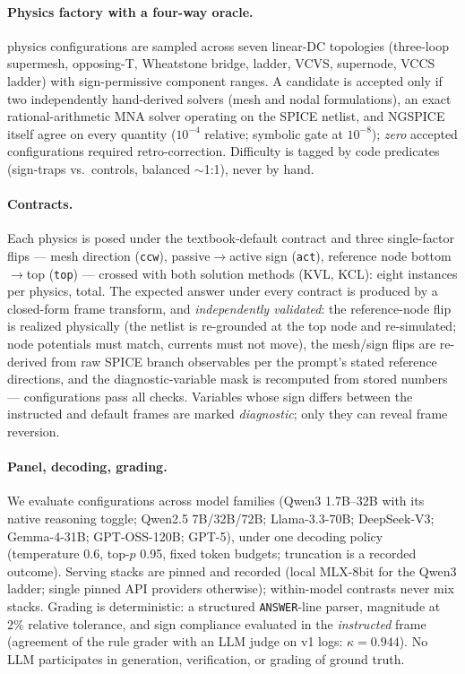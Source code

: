 \documentclass[11pt]{article}
\begin{document}
\paragraph{Physics factory with a four-way oracle.}
\NPhysics{} physics configurations are sampled across seven linear-DC
topologies (three-loop supermesh, opposing-T, Wheatstone bridge, ladder, VCVS,
supernode, VCCS ladder) with sign-permissive component ranges. A candidate is
accepted only if two independently hand-derived solvers (mesh and nodal
formulations), an exact rational-arithmetic MNA solver operating on the SPICE
netlist, and NGSPICE itself agree on every quantity ($10^{-4}$ relative;
symbolic gate at $10^{-8}$); \emph{zero} accepted configurations required
retro-correction. Difficulty is tagged by code predicates
(sign-traps vs.\ controls, balanced $\sim$1:1), never by hand.

\paragraph{Contracts.}
Each physics is posed under the textbook-default contract and three
single-factor flips --- mesh direction (\texttt{ccw}), passive$\to$active sign
(\texttt{act}), reference node bottom$\to$top (\texttt{top}) --- crossed with
both solution methods (KVL, KCL): eight instances per physics,
\NInstances{} total. The expected answer under every contract is produced by a
closed-form frame transform, and \emph{independently validated}: the
reference-node flip is realized physically (the netlist is re-grounded at the
top node and re-simulated; node potentials must match, currents must not
move), the mesh/sign flips are re-derived from raw SPICE branch observables
per the prompt's stated reference directions, and the diagnostic-variable mask
is recomputed from stored numbers --- \TvPass{} configurations pass all
checks. Variables whose sign differs between the instructed and default frames
are marked \emph{diagnostic}; only they can reveal frame reversion.

\paragraph{Panel, decoding, grading.}
We evaluate \NColumns{} configurations across \NFamilies{} model families
(Qwen3 1.7B--32B with its native reasoning toggle; Qwen2.5 7B/32B/72B;
Llama-3.3-70B; DeepSeek-V3; Gemma-4-31B; GPT-OSS-120B; GPT-5), under one
decoding policy (temperature 0.6, top-$p$ 0.95, fixed token budgets;
truncation is a recorded outcome). Serving stacks are pinned and recorded
(local MLX-8bit for the Qwen3 ladder; single pinned API providers otherwise);
within-model contrasts never mix stacks. Grading is deterministic: a
structured \texttt{ANSWER}-line parser, magnitude at 2\% relative tolerance,
and sign compliance evaluated in the \emph{instructed} frame (agreement of the
rule grader with an LLM judge on v1 logs: $\kappa=0.944$). No LLM
participates in generation, verification, or grading of ground truth.
\end{document}
